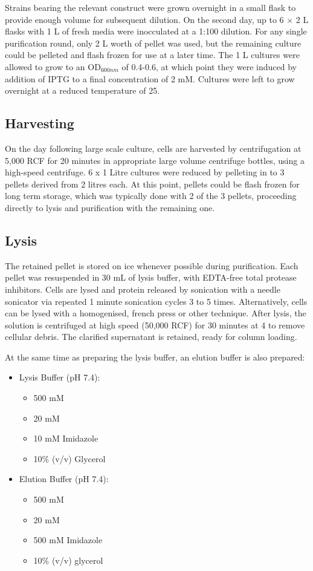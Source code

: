 Strains bearing the relevant construct were grown overnight in a small flask to provide enough volume for subsequent dilution. On the second day, up to 6 $\times$ 2 L flasks with 1 L of fresh media were inocculated at a 1:100 dilution. For any single purification round, only 2 L worth of pellet was used, but the remaining culture could be pelleted and flash frozen for use at a later time. The 1 L cultures were allowed to grow to an OD$_{600nm}$ of 0.4-0.6, at which point they were induced by addition of IPTG to a final concentration of 2 mM. Cultures were left to grow overnight at a reduced temperature of 25\degC.

\subsection{Harvesting}
On the day following large scale culture, cells are harvested by centrifugation at 5,000 RCF for 20 minutes in appropriate large volume centrifuge bottles, using a high-speed centrifuge. 6 x 1 Litre cultures were reduced by pelleting in to 3 pellets derived from 2 litres each. At this point, pellets could be flash frozen for long term storage, which was typically done with 2 of the 3 pellets, proceeding directly to lysis and purification with the remaining one.

\subsection{Lysis}
The retained pellet is stored on ice whenever possible during purification. Each pellet was resuspended in 30 mL of lysis buffer, with EDTA-free total protease inhibitors. Cells are lysed and protein released by sonication with a needle sonicator via repeated 1 minute sonication cycles 3 to 5 times. Alternatively, cells can be lysed with a homogenised, french press or other technique. After lysis, the solution is centrifuged at high speed (50,000 RCF) for 30 minutes at 4\degC{} to remove cellular debris. The clarified supernatant is retained, ready for column loading.

At the same time as preparing the lysis buffer, an elution buffer is also prepared:


		\small
		\begin{itemize}
		\item Lysis Buffer (pH 7.4):
			\begin{itemize}
			\item 500 mM \NaCl{}
			\item 20 mM \NaPO{}
			\item 10 mM Imidazole
			\item 10\% (v/v) Glycerol
			\end{itemize}
		\item Elution Buffer (pH 7.4):
			\begin{itemize}
			\item 500 mM \NaCl{}
			\item 20 mM \NaPO{}
			\item 500 mM Imidazole
			\item 10\% (v/v) glycerol
			\end{itemize}
		\end{itemize}
		\normalsize
	
